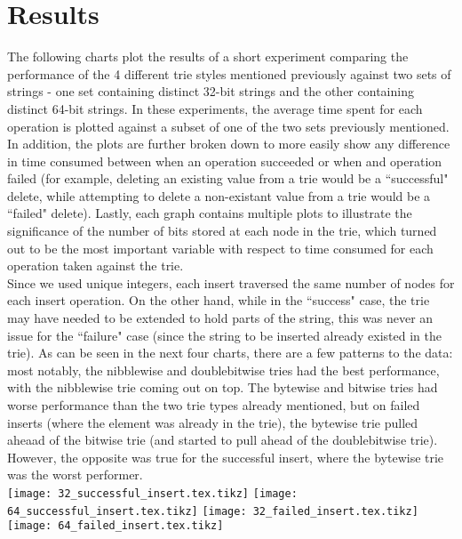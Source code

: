 \documentclass{llncs}
\begin{document}
\section{Results}
The following charts plot the results of a short experiment comparing the performance of the 4 different trie styles mentioned previously against two sets of strings - one set containing distinct 32-bit strings and the other containing distinct 64-bit strings. In these experiments, the average time spent for each operation is plotted against a subset of one of the two sets previously mentioned. In addition, the plots are further broken down to more easily show any difference in time consumed between when an operation succeeded or when and operation failed (for example, deleting an existing value from a trie would be a ``successful" delete, while attempting to delete a non-existant value from a trie would be a ``failed" delete). Lastly, each graph contains multiple plots to illustrate the significance of the number of bits stored at each node in the trie, which turned out to be the most important variable with respect to time consumed for each operation taken against the trie. \\
\newpage
Since we used unique integers, each insert traversed the same number of nodes for each insert operation. On the other hand, while in the ``success" case, the trie may have needed to be extended to hold parts of the string, this was never an issue for the ``failure" case (since the string to be inserted already existed in the trie). As can be seen in the next four charts, there are a few patterns to the data: most notably, the nibblewise and doublebitwise tries had the best performance, with the nibblewise trie coming out on top. The bytewise and bitwise tries had worse performance than the two trie types already mentioned, but on failed inserts (where the element was already in the trie), the bytewise trie pulled aheaad of the bitwise trie (and started to pull ahead of the doublebitwise trie). However, the opposite was true for the successful insert, where the bytewise trie was the worst performer.\\
\texttt{[image: 32\_successful\_insert.tex.tikz]}
\texttt{[image: 64\_successful\_insert.tex.tikz]}
\texttt{[image: 32\_failed\_insert.tex.tikz]}
\texttt{[image: 64\_failed\_insert.tex.tikz]}
\end{document}
